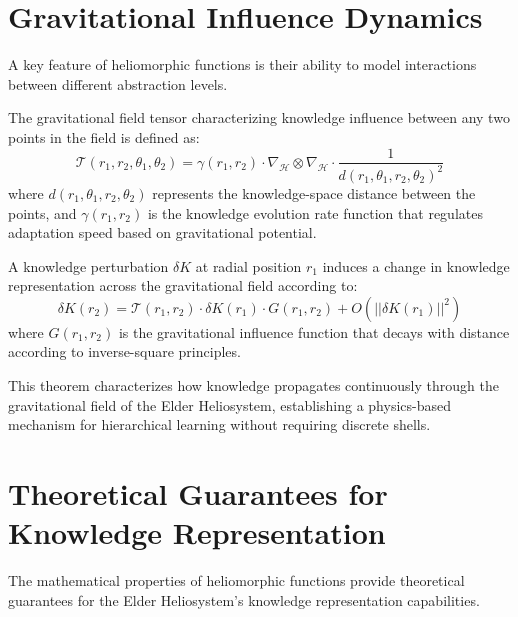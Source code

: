 \section{Gravitational Influence Dynamics}

A key feature of heliomorphic functions is their ability to model interactions between different abstraction levels.

\begin{definition}
The gravitational field tensor characterizing knowledge influence between any two points in the field is defined as:
\begin{equation}
\mathcal{T}(r_1, r_2, \theta_1, \theta_2) = \gamma(r_1, r_2) \cdot \nabla_{\mathcal{H}} \otimes \nabla_{\mathcal{H}} \cdot \frac{1}{d(r_1,\theta_1,r_2,\theta_2)^2}
\end{equation}
where $d(r_1,\theta_1,r_2,\theta_2)$ represents the knowledge-space distance between the points, and $\gamma(r_1, r_2)$ is the knowledge evolution rate function that regulates adaptation speed based on gravitational potential.
\end{definition}

\begin{theorem}
A knowledge perturbation $\delta K$ at radial position $r_1$ induces a change in knowledge representation across the gravitational field according to:
\begin{equation}
\delta K(r_2) = \mathcal{T}(r_1, r_2) \cdot \delta K(r_1) \cdot G(r_1, r_2) + O(||\delta K(r_1)||^2)
\end{equation}
where $G(r_1, r_2)$ is the gravitational influence function that decays with distance according to inverse-square principles.
\end{theorem}

This theorem characterizes how knowledge propagates continuously through the gravitational field of the Elder Heliosystem, establishing a physics-based mechanism for hierarchical learning without requiring discrete shells.

\section{Theoretical Guarantees for Knowledge Representation}

The mathematical properties of heliomorphic functions provide theoretical guarantees for the Elder Heliosystem's knowledge representation capabilities.

